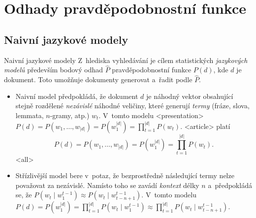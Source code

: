 \section{Odhady pravděpodobnostní funkce}
\subsection{Naivní jazykové modely}

\begin{frame}{Naivní jazykové modely}
Z~hlediska vyhledávání je cílem statistických \emph{jazykových
modelů} především bodový odhad $\hat P$ pravděpodobnostní
funkce $P(d)$, kde $d$ je dokument. Toto umožňuje dokumenty generovat a~řadit
podle $\hat P$.
\autocites[kap.~12]{manning08}{ponte98}{hiemstra98}{berger99}{miller99}

\pause

\begin{itemize}[<+->]
\item Naivní model předpokládá, že dokument $d$ je náhodný vektor obsahující
  stejně rozdělené \emph{nezávislé} náhodné veličiny, které generují
  \emph{termy} (fráze, slova, lemmata, $n$-gramy, atp.) $w_t$.
  V~tomto modelu
\mode
<presentation>
  $P(d) = P(w_1, \ldots, w_{|d|}) = P(w_1^{|d|}) = \prod_{t=1}^{|d|} P(w_t)$.
\mode
<article>
  platí
  $$P(d) = P(w_1, \ldots, w_{|d|}) = P(w_1^{|d|}) = \prod_{t=1}^{|d|} P(w_t).$$
\mode
<all>
\item Střízlivější model bere v~potaz, že bezprostředně následující termy nelze
  považovat za nezávislé. Namísto toho se zavádí \emph{kontext} délky $n$ a~předpokládá se, že $P(w_t\mid w_1^{t-1})\approx
  P(w_t\mid w_{t-n+1}^{t-1})$. V~tomto modelu $P(d) = P(w_1^{|d|}) =
  \prod_{t=1}^{|d|} P(w_t\mid w_1^{t-1})\approx \prod_{t=1}^{|d|} P(w_t\mid
  w_{t-n+1}^{t-1})$.
\end{itemize}
\end{frame}

